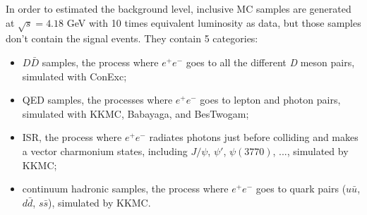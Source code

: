\documentclass[aps,preprint,tightenlines,superscriptaddress,showpacs,byrevtex,amsmath,amssymb,nofloatfix]{revtex4}
\begin{document}
In order to estimated the background level, inclusive MC samples are generated at $\sqrt{s}=4.18$ GeV with 10 times equivalent luminosity as data, but those samples don't contain the signal events. They contain 5 categories:
\begin{itemize}
  \item $D\bar{D}$ samples, the process where $e^{+}e^{-}$ goes to all the different \emph{D} meson pairs, simulated with ConExc;
  \item QED samples, the processes where $e^{+}e^{-}$ goes to lepton and photon pairs,  simulated with KKMC, Babayaga, and BesTwogam;%
  \item ISR, the process where $e^{+}e^{-}$ radiates photons just before colliding and makes a vector charmonium states, including $J/\psi$, $\psi'$, $\psi(3770)$, ..., simulated by KKMC;
  \item continuum hadronic samples, the process where $e^{+}e^{-}$ goes to quark pairs ($u\bar{u}$, $d\bar{d}$, $s\bar{s}$), simulated by KKMC.
\end{itemize}

\end{document}
